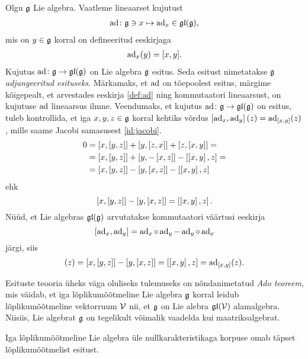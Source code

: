 \begin{naide}\label{naide:adjoint-repr}
    Olgu $\mathfrak{g}$ Lie algebra. Vaatleme lineaarset kujutust
    \begin{align*}
        \operatorname{ad} \colon \mathfrak{g} \ni x \mapsto \operatorname{ad}_x \in \mathfrak{gl}(\mathfrak{g}),
    \end{align*}
    mis on $y \in \mathfrak{g}$ korral on defineeritud eeskirjaga
    \begin{align}\label{def:ad}
        \operatorname{ad}_x(y) = [x, y].
    \end{align}
    Kujutus $\operatorname{ad} \colon \mathfrak{g} \to \mathfrak{gl}(\mathfrak{g})$ on Lie algebra $\mathfrak{g}$ esitus. Seda esitust
    nimetatakse $\mathfrak{g}$ \emph{adjungeeritud esituseks}. Märkamaks, et $\operatorname{ad}$ on
    tõepoolest esitus, märgime kõigepealt, et arvestades eeskirja
    \eqref{def:ad} ning kommutaatori lineaarsust, on kujutuse $\operatorname{ad}$
    lineaarsus ilmne. Veendumaks, et kujutus $\operatorname{ad} \colon \mathfrak{g} \to \mathfrak{gl}(\mathfrak{g})$ on
    esitus, tuleb kontrollida, et iga $x, y, z \in \mathfrak{g}$ korral kehtiks võrdus
    $\left[ \operatorname{ad}_x, \operatorname{ad}_y \right](z) = \operatorname{ad}_{[x, y]}(z)$, mille saame Jacobi
    samasusest \eqref{id:jacobi}.
    \begin{align*}
        0 &= \left[ x, \left[ y, z \right] \right] + \left[ y, \left[ z, x \right] \right] +
             \left[ z, \left[ x, y \right] \right] = \\
          &= \left[ x, \left[ y, z \right] \right] + \left[ y, -\left[ x, z \right] \right] -
             \left[ \left[ x, y \right], z \right] = \\
          &= \left[ x, \left[ y, z \right] \right] - \left[ y, \left[ x, z \right] \right] -
             \left[ \left[ x, y \right], z \right]
    \end{align*}
    ehk
    \[
        \left[ x, \left[ y, z \right] \right] - \left[ y, \left[ x, z \right] \right] = \left[ \left[ x, y \right], z \right].
    \]
    Nüüd, et Lie algebras $\mathfrak{gl}(\mathfrak{g})$ arvutatakse kommutaatori väärtusi eeskirja
    \[
        [\operatorname{ad}_x, \operatorname{ad}_y] = \operatorname{ad}_x \circ \operatorname{ad}_y - \operatorname{ad}_y \circ \operatorname{ad}_x
    \]
    järgi, siis
    \begin{align*}
        [\ad_x, \ad_y](z) = \brac{x}{\brac{y}{z}} - \brac{y}{\brac{x}{z}} =
        \brac{\brac{x}{y}}{z} = \ad_{\brac{x}{y}}(z).
    \end{align*}
\end{naide}

Esituste teooria üheks väga oluliseks tulemuseks on nõndanimetatud
\emph{Ado teoreem}, mis väidab, et iga lõplikumõõtmeline Lie algebra $\mathfrak{g}$
korral leidub lõplikumõõtmeline vektorruum $\mathcal{V}$ nii, et $\mathfrak{g}$ on
Lie alebra $\mathfrak{gl}(\mathcal{V})$ alamalgebra. Niisiis, Lie algebrat $\mathfrak{g}$
on tegelikult võimalik vaadelda kui maatriksalgebrat. \cite{hall2003lie}

\begin{thm}[Ado, 1935]
    Iga lõplikumõõtmeline Lie algebra üle nullkarakteristikaga korpuse omab
    täpset lõplikumõõtmelist esitust.
\end{thm}


